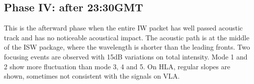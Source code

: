 \subsection{Phase IV: after 23:30GMT}
This is the afterward phase when the entire IW packet has well passed acoustic track and has no noticeable acoustical impact. 
The acoustic path is at the middle of the ISW package, where the
wavelength is shorter than the leading fronts. Two focusing events
are observed with 15dB variations on total intensity. Mode 1 and 2
show more fluctuation than mode 3, 4 and 5. On HLA, regular slopes
are shown, sometimes not consistent with the signals on VLA.
